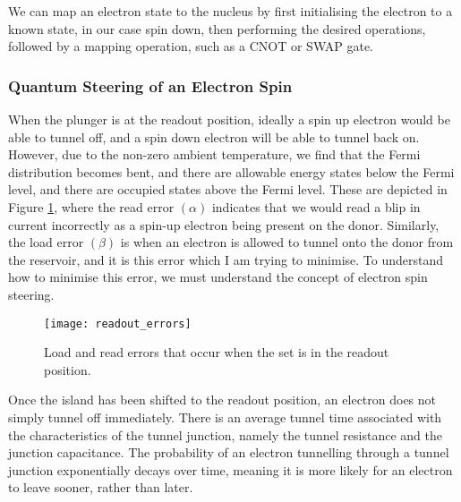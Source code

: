 		We can map an electron state to the nucleus by first initialising the electron to a known state, in our case spin down, then performing the desired operations, followed by a mapping operation, such as a CNOT or SWAP gate.
		
	\subsubsection{Quantum Steering of an Electron Spin}
	
	When the plunger is at the readout position, ideally a spin up electron would be able to tunnel off, and a spin down electron will be able to tunnel back on. However, due to the non-zero ambient temperature, we find that the Fermi distribution becomes bent, and there are allowable energy states below the Fermi level, and there are occupied states above the Fermi level. These are depicted in Figure \ref{fig::errors}, where the read error $(\alpha)$ indicates that we would read a blip in current incorrectly as a spin-up electron being present on the donor. Similarly, the load error $(\beta)$ is when an electron is allowed to tunnel onto the donor from the reservoir, and it is this error which I am trying to minimise. To understand how to minimise this error, we must understand the concept of electron spin steering.
	
	\begin{figure}[htbp!]
		\centering
		\texttt{[image: readout\_errors]}
		\caption[Load and red errors in the \gls{set} readout position]{Load and read errors that occur when the \gls{set} is in the readout position.\cite{electron_spin_silicon}}
		\label{fig::errors}
	\end{figure}
	
	Once the island has been shifted to the readout position, an electron does not simply tunnel off immediately. There is an average tunnel time associated with the characteristics of the tunnel junction, namely the tunnel resistance and the junction capacitance. The probability of an electron tunnelling through a tunnel junction exponentially decays over time, meaning it is more likely for an electron to leave sooner, rather than later. \\
	
